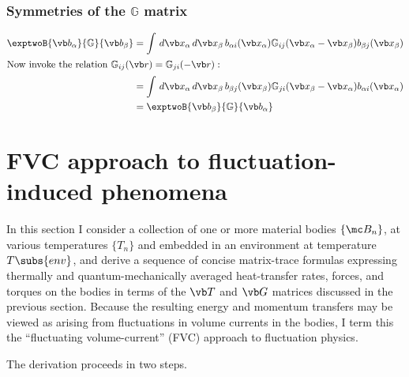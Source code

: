 \documentclass[letterpaper]{article}
\begin{document}
\subsubsection*{Symmetries of the $\mathbb{G}$ matrix} 
\begin{align*}
 \exptwoB{\vb b_\alpha}{\mathbb{G}}{\vb b_\beta}
&=\int \, d\vb x_\alpha \, d\vb x_\beta \,
   b_{\alpha i}(\vb x_\alpha) 
   \mathbb{G}_{ij}(\vb x_\alpha-\vb x_\beta)
   b_{\beta j}(\vb x_\beta)
\\
\intertext{Now invoke the relation 
           $\mathbb{G}_{ij}(\vb r) = \mathbb{G}_{ji}(-\vb r):$
          }
&=\int \, d\vb x_\alpha \, d\vb x_\beta \,
   b_{\beta j}(\vb x_\beta)
   \mathbb{G}_{ji}(\vb x_\beta - \vb x_\alpha)
   b_{\alpha i}(\vb x_\alpha) 
\\
&=
 \exptwoB{\vb b_\beta}{\mathbb{G}}{\vb b_\alpha}
\end{align*}

\newpage
\section{FVC approach to fluctuation-induced phenomena}

In this section I consider a collection of one or 
more material bodies $\{\mc B_n\}$, at various temperatures
$\{T_n\}$ and embedded in an environment at
temperature $T\subs{env}$, and derive a sequence of concise
matrix-trace formulas expressing thermally and quantum-mechanically 
averaged heat-transfer rates, forces, and torques on the bodies 
in terms of the $\vb T$ and $\vb G$ matrices discussed in the 
previous section. Because the resulting energy and momentum
transfers may be viewed as arising from fluctuations in volume 
currents in the bodies, I term this the 
``fluctuating volume-current'' (FVC) approach to fluctuation
physics.

The derivation proceeds in two steps.
\end{document}
